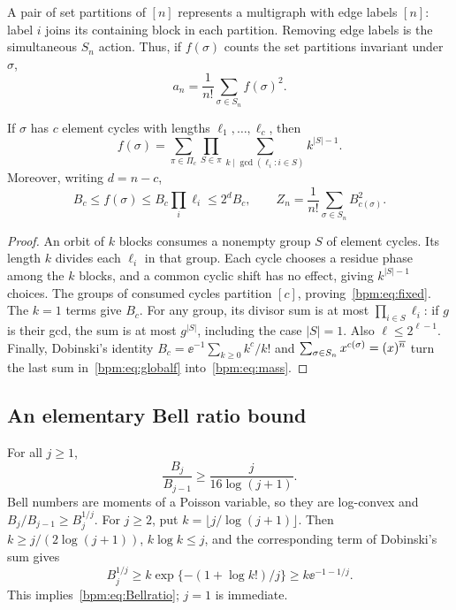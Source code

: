 \documentclass[11pt,a4paper]{article}
\theoremstyle{remark}\newtheorem{remark}[theorem]{Remark}%
\begin{document}
A pair of set partitions of $[n]$ represents a multigraph with edge labels $[n]$: label $i$ joins its containing block in each partition. Removing edge labels is the simultaneous $S_n$ action. Thus, if $f(\sigma)$ counts the set partitions invariant under $\sigma$,
\begin{equation}\label{bpm:eq:Burnside}
 a_n=\frac1{n!}\sum_{\sigma\in S_n}f(\sigma)^2.
\end{equation}

\begin{lemma}\label{bpm:lem:fixed}
If $\sigma$ has $c$ element cycles with lengths $\ell_1,\ldots,\ell_c$, then
\begin{equation}\label{bpm:eq:fixed}
 f(\sigma)=\sum_{\pi\in\Pi_c}\prod_{S\in\pi}
 \sum_{k\mid\gcd(\ell_i:i\in S)}k^{|S|-1}.
\end{equation}
Moreover, writing $d=n-c$,
\begin{equation}\label{bpm:eq:globalf}
 B_c\le f(\sigma)\le B_c\prod_i\ell_i\le2^d B_c,
 \qquad
 Z_n=\frac1{n!}\sum_{\sigma\in S_n}B_{c(\sigma)}^2.
\end{equation}
\end{lemma}
\begin{proof}
An orbit of $k$ blocks consumes a nonempty group $S$ of element cycles. Its length $k$ divides each $\ell_i$ in that group. Each cycle chooses a residue phase among the $k$ blocks, and a common cyclic shift has no effect, giving $k^{|S|-1}$ choices. The groups of consumed cycles partition $[c]$, proving~\eqref{bpm:eq:fixed}.
The $k=1$ terms give $B_c$. For any group, its divisor sum is at most $\prod_{i\in S}\ell_i$: if $g$ is their gcd, the sum is at most $g^{|S|}$, including the case $|S|=1$. Also $\ell\le2^{\ell-1}$.
Finally, Dobinski's identity $B_c=\ee^{-1}\sum_{k\ge0}k^c/k!$ and
$\sum_{\sigma\in S_n}x^{c(\sigma)}=(x)^{\overline{n}}$ turn the last sum in~\eqref{bpm:eq:globalf} into~\eqref{bpm:eq:mass}.
\end{proof}

\subsection*{An elementary Bell ratio bound}
For all $j\ge1$,
\begin{equation}\label{bpm:eq:Bellratio}
 \frac{B_j}{B_{j-1}}\ge\frac{j}{16\log(j+1)}.
\end{equation}
Bell numbers are moments of a Poisson variable, so they are log-convex and $B_j/B_{j-1}\ge B_j^{1/j}$. For $j\ge2$, put $k=\lfloor j/\log(j+1)\rfloor$. Then $k\ge j/(2\log(j+1))$, $k\log k\le j$, and the corresponding term of Dobinski's sum gives
\[
 B_j^{1/j}\ge k\exp\{-(1+\log k!)/j\}\ge k\ee^{-1-1/j}.
\]
This implies~\eqref{bpm:eq:Bellratio}; $j=1$ is immediate.
\end{document}
